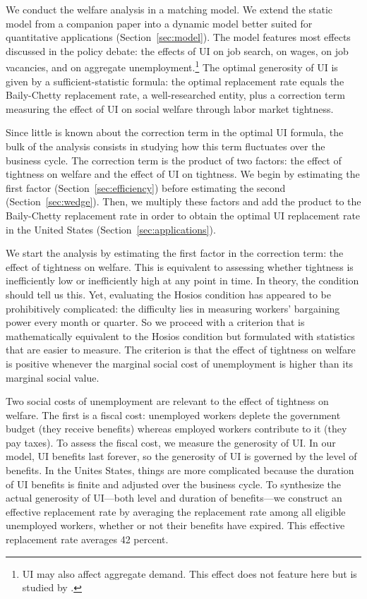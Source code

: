 \documentclass[letterpaper,12pt,leqno]{article}
\begin{document}
We conduct the welfare analysis in a matching model. We extend the static model from a companion paper \citep{LMS10} into a dynamic model better suited for quantitative applications (Section~\ref{sec:model}). The model features most effects discussed in the policy debate: the effects of UI on job search, on wages, on job vacancies, and on aggregate unemployment.\footnote{UI may also affect aggregate demand. This effect does not feature here but is studied by \citet{K16}.} The optimal generosity of UI is given by a sufficient-statistic formula: the optimal replacement rate equals the Baily-Chetty replacement rate, a well-researched entity, plus a correction term measuring the effect of UI on social welfare through labor market tightness. 

Since little is known about the correction term in the optimal UI formula, the bulk of the analysis consists in studying how this term fluctuates over the business cycle. The correction term is the product of two factors: the effect of tightness on welfare and the effect of UI on tightness. We begin by estimating the first factor (Section~\ref{sec:efficiency}) before estimating the second (Section~\ref{sec:wedge}). Then, we multiply these factors and add the product to the Baily-Chetty replacement rate in order to obtain the optimal UI replacement rate in the United States (Section~\ref{sec:applications}).

We start the analysis by estimating the first factor in the correction term: the effect of tightness on welfare. This is equivalent to assessing whether tightness is inefficiently low or inefficiently high at any point in time. In theory, the \citet{H90} condition should tell us this. Yet, evaluating the Hosios condition has appeared to be prohibitively complicated: the difficulty lies in measuring workers' bargaining power every month or quarter. So we proceed with a criterion that is mathematically equivalent to the Hosios condition but formulated with statistics that are easier to measure. The criterion is that the effect of tightness on welfare is positive whenever the marginal social cost of unemployment is higher than its marginal social value.  

Two social costs of unemployment are relevant to the effect of tightness on welfare. The first is a fiscal cost: unemployed workers deplete the government budget (they receive benefits) whereas employed workers contribute to it (they pay taxes). To assess the fiscal cost, we measure the generosity of UI. In our model, UI benefits last forever, so the generosity of UI is governed by the level of benefits. In the Unites States, things are more complicated because the duration of UI benefits is finite and adjusted over the business cycle. To synthesize the actual generosity of UI---both level and duration of benefits---we construct an effective replacement rate by averaging the replacement rate among all eligible unemployed workers, whether or not their benefits have expired. This effective replacement rate averages 42 percent.
\end{document}
